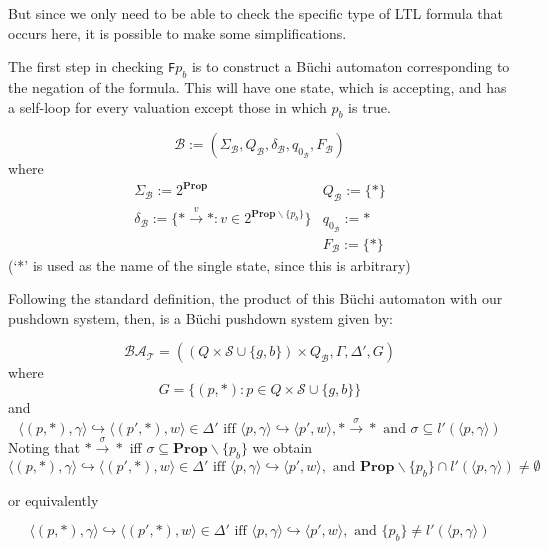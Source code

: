 \documentclass[11pt]{article}
\theoremstyle{definition}
\begin{document}
But since we only need to be able to check the specific type of LTL formula
that occurs here, it is possible to make some simplifications.

The first step in checking \texttt{F}$p_b$ is to construct a B\"{u}chi
automaton corresponding to the negation of the formula. This will have one
state, which is accepting, and has a self-loop for every valuation except those
in which $p_b$ is true. 

\[ 
\mathcal{B} := (\Sigma_\mathcal{B}, Q_\mathcal{B}, \delta_\mathcal{B}, q_{0_\mathcal{B}}, F_\mathcal{B})
\]
where
\begin{displaymath}
     \begin{array}{cc}
     \Sigma_\mathcal{B} := 2^{\textbf{Prop}}                        
     & Q_\mathcal{B} := \{ * \} \\
     \delta_\mathcal{B} := \{ * \xrightarrow{v} * : v \in 2^{\textbf{Prop}\backslash\{p_b\}}  \}
     & q_{0_\mathcal{B}} := * \\
        & F_\mathcal{B} := \{*\}
   \end{array}
\end{displaymath}
(`*' is used as the name of the single state, since this is arbitrary)


Following the standard definition\cite{EHRS00b}, the product of this B\"{u}chi automaton with our pushdown system, then, is a B\"{u}chi pushdown system given by:

\[ 
\mathcal{BA_T} = ( (Q \times \mathcal{S} \cup \{g, b\}) \times Q_\mathcal{B}, \Gamma, \Delta', G) 
\]
where
\[ G = \{ (p, *) : p \in Q \times \mathcal{S} \cup \{g, b\} \} \]
and 
\[ \langle (p, *), \gamma \rangle \hookrightarrow \langle (p', *), w\rangle \in \Delta' 
\text{ iff } \langle p, \gamma \rangle \hookrightarrow \langle p', w \rangle, *
\xrightarrow{\sigma} *\text{ and }\sigma \subseteq l'(\langle p, \gamma
\rangle) \]
Noting that $* \xrightarrow{\sigma} *$ iff $\sigma \subseteq \textbf{Prop}\backslash\{p_b\}$ we obtain 
\[ \langle (p, *), \gamma \rangle \hookrightarrow \langle (p', *), w\rangle \in \Delta' 
\text{ iff } \langle p, \gamma \rangle \hookrightarrow \langle p', w \rangle,\text{ and } \textbf{Prop}\backslash\{p_b\} \cap l'(\langle p, \gamma
\rangle) \neq \emptyset\]

or equivalently

\[ \langle (p, *), \gamma \rangle \hookrightarrow \langle (p', *), w\rangle \in \Delta' 
\text{ iff } \langle p, \gamma \rangle \hookrightarrow \langle p', w \rangle,\text{ and } \{ p_b \} \neq l'(\langle p, \gamma \rangle) \]
\end{document}
